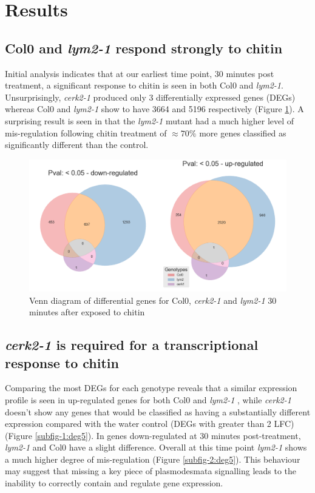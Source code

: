 \documentclass[../main.tex]{subfiles}
\begin{document}
\section{Results}
\label{sec:seqresults}

\subsection{Col0 and \textit{lym2-1} respond strongly to chitin}

Initial analysis indicates that at our earliest time point, 30 minutes post
treatment, a significant response to chitin is seen in both Col0 and
\textit{lym2-1}. Unsurprisingly, \textit{cerk2-1} produced only 3 differentially
expressed genes (DEGs) whereas Col0 and \textit{lym2-1} show to have 3664 and
5196 respectively (Figure \ref{fig:05hrDEGs}). A surprising result is seen in that the
\textit{lym2-1} mutant had a much higher level of mis-regulation following
chitin treatment of $\approx70\%$ more genes classified as significantly different
than the control.

\begin{figure}[ht]
  \centering
  \includegraphics[width=0.6\columnwidth]{figures/vennTreatmentschitin.png}
  \caption{\label{fig:05hrDEGs} Venn diagram of differential genes for Col0,
    \textit{cerk2-1} and \textit{lym2-1} 30 minutes after exposed to chitin}
\end{figure}

\subsection{\textit{cerk2-1} is required for a transcriptional response to chitin}

Comparing the most DEGs for each genotype reveals that a similar expression
profile is seen in up-regulated genes for both Col0 and \textit{lym2-1} , while
\textit{cerk2-1} doesn't show any genes that would be classified as having a
substantially different expression compared with the water control (DEGs with
greater than 2 LFC) (Figure \ref{subfig-1:deg5}). In genes down-regulated at 30
minutes post-treatment, \textit{lym2-1} and Col0 have a slight difference.
Overall at this time point \textit{lym2-1} shows a much higher degree of
mis-regulation (Figure \ref{subfig-2:deg5}). This behaviour may suggest that
missing a key piece of plasmodesmata signalling leads to the inability to
correctly contain and regulate gene expression.
\end{document}

